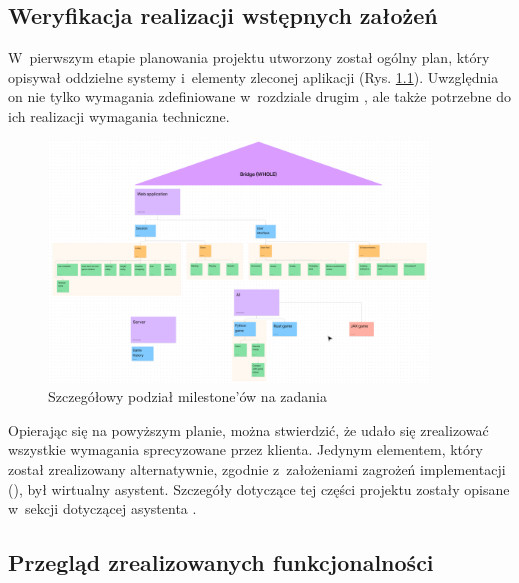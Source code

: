 \chapter{\ChapterTitleResults}
\label{sec:wyniki-projektu}

\section{Weryfikacja realizacji wstępnych założeń}

W~pierwszym etapie planowania projektu utworzony został ogólny
plan, który opisywał oddzielne systemy i~elementy
zleconej aplikacji (Rys. \ref{fig:figma_strategicplan}).
Uwzględnia on nie tylko wymagania zdefiniowane w~rozdziale drugim
, ale także potrzebne do ich
realizacji wymagania techniczne.

\begin{figure}[h!]
  \centering
  \includegraphics[width=0.9\textwidth]{img/schematy/milestones.png}
  \caption{Szczegółowy podział milestone'ów na zadania}
  \label{fig:figma_strategicplan}
\end{figure}

Opierając się na powyższym planie, można stwierdzić, że udało się
zrealizować wszystkie wymagania sprecyzowane przez klienta.
Jedynym elementem, który został zrealizowany alternatywnie,
zgodnie z~założeniami zagrożeń implementacji
(), był wirtualny asystent. Szczegóły
dotyczące tej części projektu zostały opisane w~sekcji dotyczącej
asystenta .

\section{Przegląd zrealizowanych funkcjonalności}

